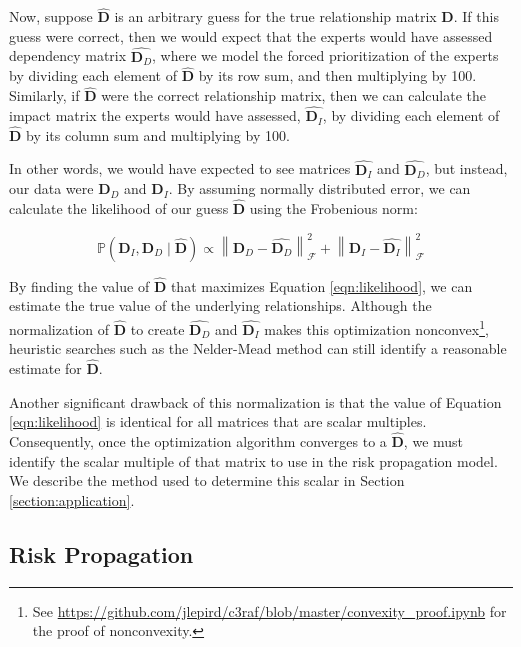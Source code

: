 \documentclass{article}
\newcommand{\norm}[1]{\left\lVert #1 \right\rVert}
\begin{document}
Now, suppose $\widehat{\mathbf{D}}$ is an arbitrary guess for the true relationship matrix $\mathbf{D}$. If this guess were correct, then we would expect that the experts would have assessed dependency matrix $\widehat{\mathbf{D}_D}$, where we model the forced prioritization of the experts by dividing each element of $\widehat{\mathbf{D}}$ by its row sum, and then multiplying by 100. Similarly, if $\widehat{\mathbf{D}}$ were the correct relationship matrix, then we can calculate the impact matrix the experts would have assessed, $\widehat{\mathbf{D}_I}$, by dividing each element of $\widehat{\mathbf{D}}$ by its column sum and multiplying by 100.

In other words, we would have expected to see matrices $\widehat{\mathbf{D}_I}$ and $\widehat{\mathbf{D}_D}$, but instead, our data were $\mathbf{D}_D$ and $\mathbf{D}_I$. By assuming normally distributed error, we can calculate the likelihood of our guess $\widehat{\mathbf{D}}$ using the Frobenious norm:

\begin{equation}
\label{eqn:likelihood}
\mathbb{P}\left(\mathbf{D}_I, \mathbf{D}_D \mid \widehat{\mathbf{D}}\right) \propto \norm{\mathbf{D}_D - \widehat{\mathbf{D}_D }}_\mathcal{F}^2 + \norm{\mathbf{D}_I - \widehat{\mathbf{D}_I }}_\mathcal{F}^2
\end{equation}

By finding the value of $\widehat{\mathbf{D}}$ that maximizes Equation \ref{eqn:likelihood}, we can estimate the true value of the underlying relationships. Although the normalization of $\widehat{\mathbf{D}}$ to create $\widehat{\mathbf{D}_D}$ and $\widehat{\mathbf{D}_I}$ makes this optimization nonconvex\footnote{See \url{https://github.com/jlepird/c3raf/blob/master/convexity_proof.ipynb} for the proof of nonconvexity.}, heuristic searches such as the Nelder-Mead method \citep{nelder1965simplex} can still identify a reasonable estimate for $\widehat{\mathbf{D}}$.

Another significant drawback of this normalization is that the value of Equation \ref{eqn:likelihood} is identical for all matrices that are scalar multiples. Consequently, once the optimization algorithm converges to a $\widehat{\mathbf{D}}$, we must identify the scalar multiple of that matrix to use in the risk propagation model. We describe the method used to determine this scalar in Section \ref{section:application}. 

\subsection{Risk Propagation}
\end{document}

